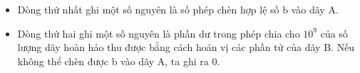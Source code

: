 \begin{itemize}
	\item     Dòng thứ nhất ghi một số nguyên là số phép chèn hợp lệ số b vào dãy A.   
	\item     Dòng thứ hai ghi một số nguyên là phần dư trong phép chia cho $10^{9}$    của số lượng dãy hoàn hảo thu được bằng cách hoán vị các phần tử của dãy B. Nếu không thể chèn được b vào dãy A, ta ghi ra 0.   
\end{itemize}